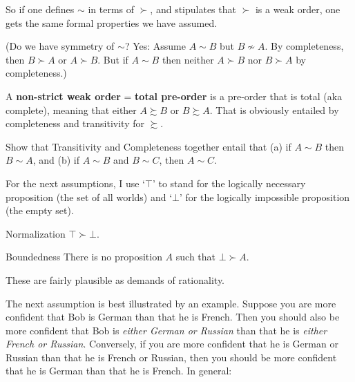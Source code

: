 {  So if one defines $\sim$ in terms of $\succ$, and stipulates that
  $\succ$ is a weak order, one gets the same formal properties we
  have assumed. 

  (Do we have symmetry of $\sim$? Yes: Assume $A \sim B$ but $B
  \not\sim A$. By completeness, then $B \succ A$ or $A \succ B$. But
  if $A \sim B$ then neither $A \succ B$ nor $B \succ A$ by
  completeness.)

  A \textbf{non-strict weak order} = \textbf{total pre-order} is a
  pre-order that is total (aka complete), meaning that either $A
  \succsim B$ or $B \succsim A$. That is obviously entailed by
  completeness and transitivity for $\succsim$.

} %

\begin{exercise3}
  Show that Transitivity and Completeness together entail that (a) if
  $A \sim B$ then $B \sim A$, and (b) if $A \sim B$ and $B \sim C$,
  then $A \sim C$.
\end{exercise3}


For the next assumptions, I use `$\top$' to stand for the logically
necessary proposition (the set of all worlds) and `$\bot$' for the
logically impossible proposition (the empty set).
%
\begin{genericthm}{Normalization}
  $\top \succ \bot$.
\end{genericthm}
\vspace{-2mm}
\begin{genericthm}{Boundedness}
  There is no proposition $A$ such that $\bot \succ A$.
\end{genericthm}
These are fairly plausible as demands of rationality. 

The next assumption is best illustrated by an example. Suppose you are
more confident that Bob is German than that he is French.  Then you
should also be more confident that Bob is \emph{either German or
  Russian} than that he is \emph{either French or
  Russian}. Conversely, if you are more confident that he is German or
Russian than that he is French or Russian, then you should be more
confident that he is German than that he is French. In general:

